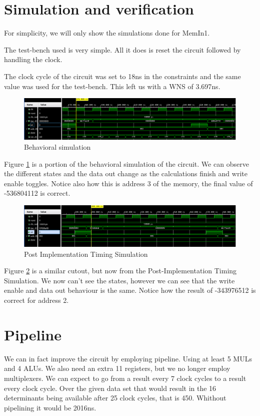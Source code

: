 \documentclass[12pt]{article}
\begin{document}
\section{Simulation and verification}

For simplicity, we will only show the simulations done for MemIn1.

The test-bench used is very simple. All it does is reset the circuit followed by handling the clock.

The clock cycle of the circuit was set to 18ns in the constraints and the same value was used for the test-bench. This left us with a WNS of 3.697ns.

\begin{figure}[H]
	\centering
	\includegraphics[width=0.7\linewidth]{Imagens/Behavioral.png}
	\caption{Behavioral simulation}
	\label{fig:behav}
\end{figure}

Figure \ref{fig:behav} is a portion of the behavioral simulation of the circuit. We can observe the different states and the data out change as the calculations finish and write enable toggles. Notice also how this is address 3 of the memory, the final value of -536804112 is correct.


\begin{figure}[H]
	\centering
	\includegraphics[width=0.7\linewidth]{Imagens/PostImplementation.png}
	\caption{Post Implementation Timing Simulation}
	\label{fig:PImple}
\end{figure}

Figure \ref{fig:PImple} is a similar cutout, but now from the Post-Implementation Timing Simulation. We now can't see the states, however we can see that the write enable and data out behaviour is the same. Notice how the result of -343976512 is correct for address 2.

\section{Pipeline}

We can in fact improve the circuit by employing pipeline. Using at least 5 MULs and 4 ALUs. We also need an extra 11 registers, but we no longer employ multiplexers.
We can expect to go from a result every 7 clock cycles to a result every clock cycle. Over the given data set that would result in the 16 determinants being available after 25 clock cycles, that is 450. Whithout pipelining it would be 2016ns.
\end{document}
